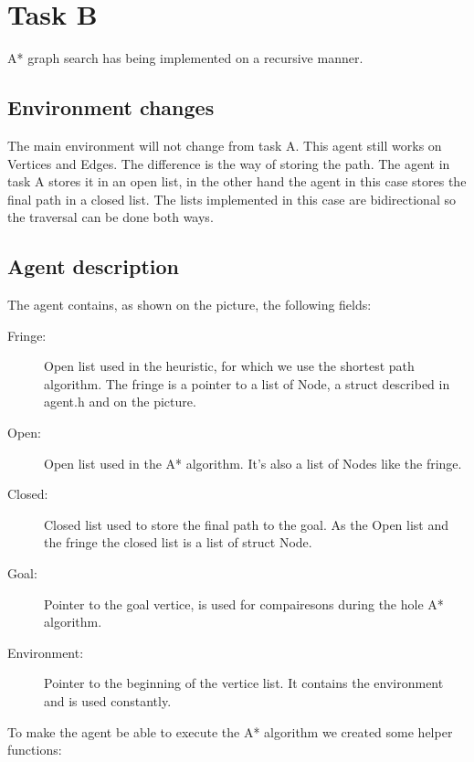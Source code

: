 
\chapter{Task B}
A* graph search has being implemented on a recursive manner. 
\section{Environment changes}
The main environment will not change from task A. This agent still works on Vertices and Edges. The difference is the way of storing the path. 
The agent in task A stores it in an open list, in the other hand the agent in this case stores the final path in a closed list. The lists 
implemented in this case are bidirectional so the traversal can be done both ways.

\section{Agent description}

The agent contains, as shown on the picture, the following fields:\\
\begin{description}
\item[Fringe:]Open list used in the heuristic, for which we use the shortest path algorithm. The fringe is a pointer to a list of Node, 
a struct described in agent.h and on the picture.
\item[Open:]Open list used in the A* algorithm. It's also a list of Nodes like the fringe.
\item[Closed:]Closed list used to store the final path to the goal. As the Open list and the fringe the closed list is a list of struct Node.
\item[Goal:]Pointer to the goal vertice, is used for compairesons during the hole A* algorithm.
\item[Environment:]Pointer to the beginning of the vertice list. It contains the  environment and is used constantly.
\end{description}

To make the agent be able to execute the A* algorithm we created some helper functions:\\

